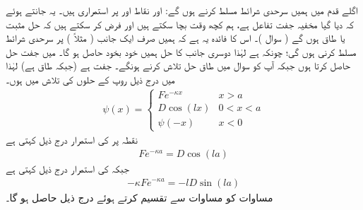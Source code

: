  اگلے قدم میں ہمیں سرحدی شرائط مسلط کرنے ہوں گے:  اور  نقاط   اور  پر استمراری ہیں۔  یہ جانتے ہوئے کہ دیا گیا  مخفیہ جفت تفاعل ہے، ہم کچھ وقت بچا سکتے ہیں اور  فرض کر سکتے ہیں کہ حل مثبت یا  طاق  ہوں گے ( سوال )۔ اس کا فائدہ  یہ  ہے کہ ہمیں صرف ایک جانب (    مثلاً ) پر    سرحدی شرائط مسلط کرنی ہوں  گی؛   چونکہ ہے لہٰذا  دوسری جانب کا حل  ہمیں خود  بخود   حاصل ہو گا۔  میں جفت حل حاصل کرتا ہوں جبکہ آپ کو سوال  میں طاق   حل تلاش کرنے ہونگے۔ جفت ہے (جبکہ طاق ہے)  لہٰذا  میں درج ذیل  روپ کے حلوں  کی تلاش میں ہوں۔ 
\begin{align}\label{مساوات_شروڈنگر_تلاش_تفاعلات}
\psi(x)=
\begin{cases}
Fe^{-\kappa x} & x> a\\
D\cos(l x) & 0< x < a\\
\psi(-x) & x< 0
\end{cases}
\end{align}
نقطہ پر    کی استمرار  درج ذیل کہتی ہے  
\begin{align}\label{مساوات_شروڈنگر_استمرار_مستقل_الف}
 Fe^{-\kappa a}=D\cos(la) 
 \end{align}
 جبکہ  کی استمرار درج ذیل  کہتی ہے
 \begin{align}\label{مساوات_شروڈنگر_استمرار_مستقل_ب}
 -\kappa Fe^{-\kappa a}=-lD\sin(la) 
 \end{align} 
 مساوات     کو مساوات  سے تقسیم کرتے ہوئے درج ذیل  حاصل ہو گا۔

